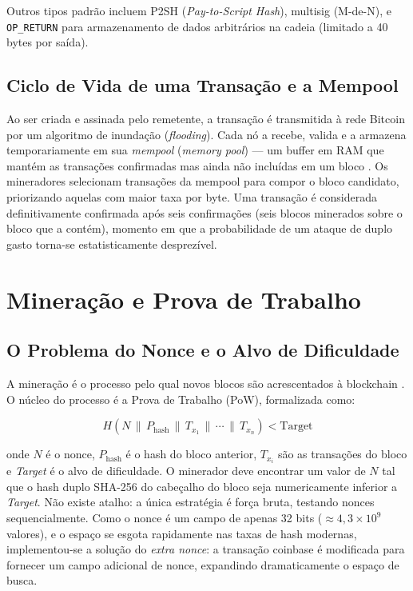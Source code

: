 \documentclass[12pt,a4paper]{report}
\begin{document}
Outros tipos padrão incluem P2SH (\textit{Pay-to-Script Hash}), multisig (M-de-N), e \texttt{OP\_RETURN} para armazenamento de dados arbitrários na cadeia (limitado a 40 bytes por saída).

\subsection{Ciclo de Vida de uma Transação e a Mempool}

Ao ser criada e assinada pelo remetente, a transação é transmitida à rede Bitcoin por um algoritmo de inundação (\textit{flooding}). Cada nó a recebe, valida e a armazena temporariamente em sua \textit{mempool} (\textit{memory pool}) --- um buffer em RAM que mantém as transações confirmadas mas ainda não incluídas em um bloco \cite{Bashir2023}. Os mineradores selecionam transações da mempool para compor o bloco candidato, priorizando aquelas com maior taxa por byte. Uma transação é considerada definitivamente confirmada após seis confirmações (seis blocos minerados sobre o bloco que a contém), momento em que a probabilidade de um ataque de duplo gasto torna-se estatisticamente desprezível.

\section{Mineração e Prova de Trabalho}

\subsection{O Problema do Nonce e o Alvo de Dificuldade}

A mineração é o processo pelo qual novos blocos são acrescentados à blockchain \cite{Bashir2023}. O núcleo do processo é a Prova de Trabalho (PoW), formalizada como:

\[
H(N \,\|\, P_{\text{hash}} \,\|\, T_{x_1} \,\|\, \cdots \,\|\, T_{x_n}) < \text{Target}
\]

onde $N$ é o nonce, $P_{\text{hash}}$ é o hash do bloco anterior, $T_{x_i}$ são as transações do bloco e \textit{Target} é o alvo de dificuldade. O minerador deve encontrar um valor de $N$ tal que o hash duplo SHA-256 do cabeçalho do bloco seja numericamente inferior a \textit{Target}. Não existe atalho: a única estratégia é força bruta, testando nonces sequencialmente. Como o nonce é um campo de apenas 32 bits ($\approx 4{,}3 \times 10^9$ valores), e o espaço se esgota rapidamente nas taxas de hash modernas, implementou-se a solução do \textit{extra nonce}: a transação coinbase é modificada para fornecer um campo adicional de nonce, expandindo dramaticamente o espaço de busca.
\end{document}
